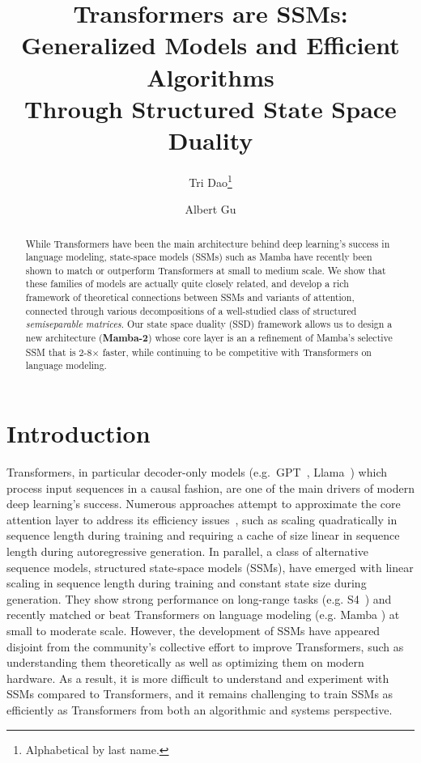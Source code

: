 \documentclass{article}
\title{Transformers are SSMs: Generalized Models and Efficient Algorithms \\ Through Structured State Space Duality}
\author[$^1$]{Tri Dao\thanks{Alphabetical by last name.}}
\author[$^2$]{Albert Gu\samethanks}
\affil[$^1$]{Department of Computer Science, Princeton University}
\affil[$^2$]{Machine Learning Department, Carnegie Mellon University}
\affil[ ]{{\texttt{tri@tridao.me}}, {\texttt{agu@cs.cmu.edu}}}
\date{}
\newcommand{\citep}{\parencite}
\begin{document}
  \maketitle

\begin{abstract}

  \noindent
  While Transformers have been the main architecture behind deep learning's
  success in language modeling, state-space models (SSMs) such as Mamba have recently been
  shown to match or outperform Transformers at small to medium scale.
  We show that these families of models are actually quite closely related,
  and develop a rich framework of theoretical connections between SSMs and variants of
  attention,
  connected through various decompositions of a well-studied class of structured \emph{semiseparable matrices}.
  Our state space duality (SSD) framework 
  allows us to design a new architecture (\textbf{Mamba-2}) whose core layer is an a refinement of Mamba's selective SSM
  that is 2-8$\times$ faster, while continuing to be competitive with
  Transformers on language modeling.

\end{abstract}

\section{Introduction}
\label{sec:intro}

Transformers, in particular decoder-only models (e.g.\ GPT~\citep{brown2020language}, Llama~\citep{touvron2023llama}) which process input sequences in a causal fashion, are one of the main drivers of modern deep learning's success.
Numerous approaches attempt to approximate the core attention layer to address its efficiency issues~\citep{tay2022efficient}, such as scaling quadratically in sequence length during training and requiring a cache of size linear in sequence length during autoregressive generation.
In parallel, a class of alternative sequence models, structured state-space models (SSMs), have emerged with linear scaling in sequence length during training and constant state size during generation.
They show strong performance on long-range tasks (e.g. S4~\citep{gu2022efficiently}) and recently matched or beat Transformers on language modeling (e.g. Mamba \citep{gu2023mamba}) at small to moderate scale.
However, the development of SSMs have appeared disjoint from the community's collective effort to improve Transformers, such as understanding them theoretically as well as optimizing them on modern hardware.
As a result, it is more difficult to understand and experiment with SSMs compared to Transformers, and it remains challenging to train SSMs as efficiently as Transformers from both an algorithmic and systems perspective.
\end{document}
